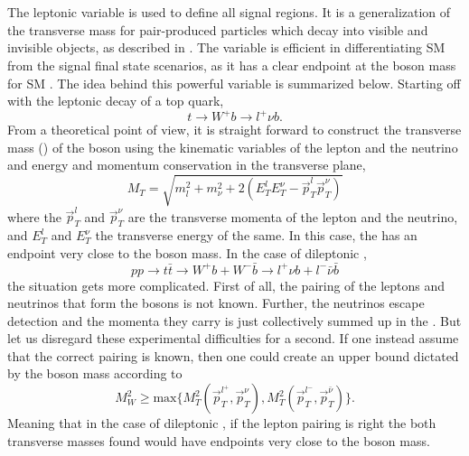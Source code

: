 \section{\mttwo}\label{sec:MT2}
\noindent\justify
The leptonic \mttwo variable is used to define all signal regions. 
It is a generalization of the transverse mass for pair-produced particles which decay into visible and invisible objects, as described in \cite{Lester:1999tx,Barr_2003}. 
The variable is efficient in differentiating SM \ttbar from the signal final state scenarios, as it has a clear endpoint at the \PW boson mass for SM \ttbar. 
The idea behind this powerful variable is summarized below. 
Starting off with the leptonic decay of a top quark, 
\begin{equation}
t\rightarrow W^{+}b \rightarrow l^{+}\nu b. 
\end{equation}
From a theoretical point of view, it is straight forward to construct the transverse mass (\mT) of the \PW boson using the kinematic variables of the lepton and the neutrino and energy and momentum conservation in the transverse plane,
\begin{equation}
M_{T}=\sqrt{m_{l}^{2}+m_{\nu}^{2}+2(E_{T}^{l}E_{T}^{\nu}-\vec{p}_{T}^{l}\vec{p}_{T}^{\nu})}
\end{equation} 
where the $\vec{p}_{T}^{l}$ and $\vec{p}_{T}^{\nu}$ are the transverse momenta of the lepton and the neutrino, and $E_{T}^{l}$ and $E_{T}^{\nu}$ the transverse energy of the same.
In this case, the \mT has an endpoint very close to the \PW boson mass. 
In the case of dileptonic \ttbar, 
\begin{equation}
pp\rightarrow t\bar{t}\rightarrow W^{+}b + W^{-}\bar{b}\rightarrow l^{+}\nu b +l^{-}\bar{\nu}\bar{b}
\end{equation}
the situation gets more complicated. 
First of all, the pairing of the leptons and neutrinos that form the \PW bosons is not known. 
Further, the neutrinos escape detection and the momenta they carry is just collectively summed up in the \ptmiss. 
But let us disregard these experimental difficulties for a second. 
If one instead assume that the correct pairing is known, then one could create an upper bound dictated by the \PW boson mass according to
\begin{equation}
M_{W}^{2}\geq \mathrm{max}\{M_{T}^{2}\left(\vec{p}_{T}^{l^{+}},\vec{p}_{T}^{\nu}\right), M_{T}^{2}\left(\vec{p}_{T}^{l^{-}},\vec{p}_{T}^{\bar{\nu}}\right)\}.
\end{equation}
Meaning that in the case of dileptonic \ttbar, if the lepton pairing is right the both transverse masses found would have endpoints very close to the \PW boson mass. 
